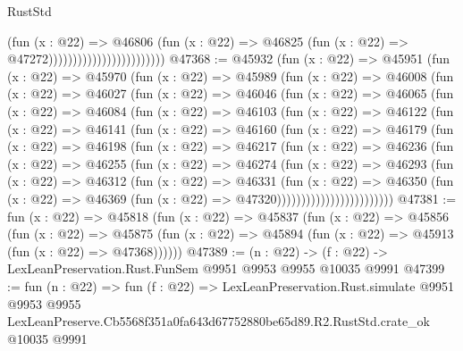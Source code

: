 \begin{lexlean}{RustStd}
\begin{coremodule}
                                              (fun (x : @22) =>
                                              @46806
                                                (fun (x : @22) =>
                                                @46825
                                                  (fun (x : @22) => @47272))))))))))))))))))))))))
@47368 := @45932
    (fun (x : @22) =>
    @45951
      (fun (x : @22) =>
      @45970
        (fun (x : @22) =>
        @45989
          (fun (x : @22) =>
          @46008
            (fun (x : @22) =>
            @46027
              (fun (x : @22) =>
              @46046
                (fun (x : @22) =>
                @46065
                  (fun (x : @22) =>
                  @46084
                    (fun (x : @22) =>
                    @46103
                      (fun (x : @22) =>
                      @46122
                        (fun (x : @22) =>
                        @46141
                          (fun (x : @22) =>
                          @46160
                            (fun (x : @22) =>
                            @46179
                              (fun (x : @22) =>
                              @46198
                                (fun (x : @22) =>
                                @46217
                                  (fun (x : @22) =>
                                  @46236
                                    (fun (x : @22) =>
                                    @46255
                                      (fun (x : @22) =>
                                      @46274
                                        (fun (x : @22) =>
                                        @46293
                                          (fun (x : @22) =>
                                          @46312
                                            (fun (x : @22) =>
                                            @46331
                                              (fun (x : @22) =>
                                              @46350
                                                (fun (x : @22) =>
                                                @46369
                                                  (fun (x : @22) => @47320))))))))))))))))))))))))
@47381 := fun (x : @22) =>
  @45818
    (fun (x : @22) =>
    @45837
      (fun (x : @22) =>
      @45856
        (fun (x : @22) =>
        @45875 (fun (x : @22) => @45894 (fun (x : @22) => @45913 (fun (x : @22) => @47368))))))
@47389 := (n : @22) -> (f : @22) -> LexLeanPreservation.Rust.FunSem @9951 @9953 @9955 @10035 @9991
@47399 := fun (n : @22) =>
  fun (f : @22) =>
  LexLeanPreservation.Rust.simulate
    @9951
    @9953
    @9955
    LexLeanPreserve.Cb5568f351a0fa643d67752880be65d89.R2.RustStd.crate_ok
    @10035
    @9991
\end{coremodule}
\end{lexlean}
